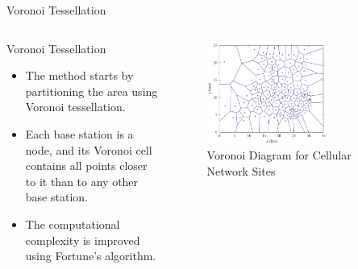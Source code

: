 \begin{frame}{Voronoi Tessellation}
    \begin{columns}
        \begin{column}{0.4\textwidth}
            \begin{block}{Voronoi Tessellation}
                    \begin{itemize}
                        \item The method starts by partitioning the area using Voronoi tessellation.
                        \item Each base station is a node, and its Voronoi cell contains all points closer to it than to any other base station.
                        \item The computational complexity is improved using Fortune's algorithm.
                    \end{itemize}
            \end{block}
        \end{column}
        \begin{column}{0.6\textwidth}
            \begin{figure}
                \includegraphics[width=0.7\textwidth]{images/Altair/Voronoi_appr/Voronoi_diagr.png}  %
                \caption{Voronoi Diagram for Cellular Network Sites}
            \end{figure}
        \end{column}
    \end{columns}
\end{frame}




